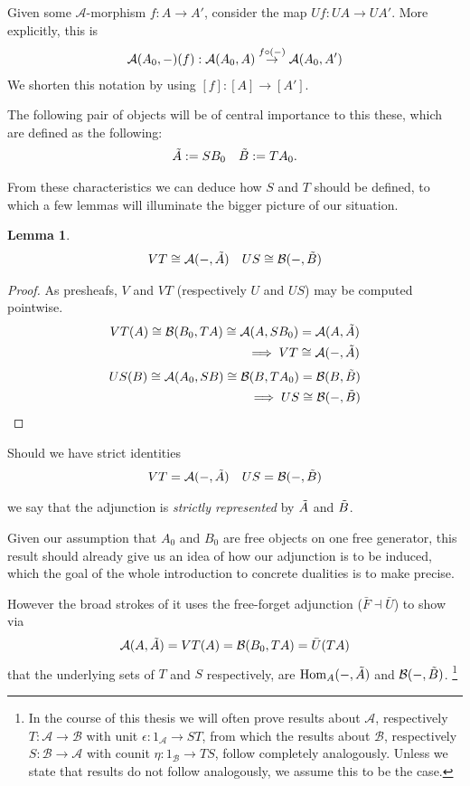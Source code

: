 \documentclass[12pt,a4paper]{article}
\newtheorem{lemma}{Lemma}[section] %
\DeclareMathOperator{\Hom}{Hom}
\def\HomA{\ensuremath\mathcal{A}}
\def\HomB{\ensuremath\mathcal{B}}
\def\t{\ensuremath\tilde}
\begin{document}
Given some $\mathcal{A}$-morphism $f: A\to A'$, consider the map $Uf: UA \to UA'$. More explicitly, this is \begin{align*}
 	\HomA(A_0, -) (f) : \HomA(A_0, A) \stackrel{f \circ (-)}{\to} \HomA(A_0, A')
 \end{align*}
We shorten this notation by using $[f]: [A] \to [A']$.

The following pair of objects will be of central importance to this these, which are defined as the following:
\begin{align*}
	\t A := SB_0&&
	\t B := TA_0.
\end{align*}


From these characteristics we can deduce how $S$ and $T$ should be defined, to which a few lemmas will illuminate the bigger picture of our situation.
\begin{lemma}
\begin{align*}
		VT \cong \HomA(-, \t  A)&&
	US \cong \HomB(-, \t  B)\\
\end{align*}
\end{lemma}
\begin{proof}
As presheafs, $V$ and $VT$ (respectively $U$ and $US$) may be computed pointwise. 
\begin{align*}
	VT(A) \cong \HomB(B_0, TA) \cong \HomA(A,SB_0) = \HomA(A, \t A) \\
	\implies VT \cong \HomA(-, \t A)
\end{align*}
\begin{align*}
	US(B) \cong  \HomA(A_0, SB) \cong  \HomB(B,TA_0) =  \HomB(B, \t B) \\
	\implies US \cong \HomB(-, \t B)
\end{align*}
\end{proof}
Should we have strict identities
\begin{align*}
		VT = \HomA(-, \t  A)&&
	US = \HomB(-, \t  B)\\
\end{align*} 

we say that the adjunction is \emph{strictly represented} by $\t A$ and $\t B$. 

Given our assumption that $A_0$ and $B_0$ are free objects on one free generator, this result should already give us an idea of how our adjunction is to be induced, which the goal of the whole introduction to concrete dualities is to make precise. 

However the broad strokes of it uses the free-forget  adjunction ($\bar F \dashv \bar U$)  to show via \begin{align*}
	\HomA(A, \t A) = VT(A) = \HomB(B_0, T A) = \bar U(TA)
\end{align*} 
that the underlying sets of $T$ and $S$ respectively, are $\Hom_A(-, \t A)$ and $\HomB(-, \t B)$. \footnote{In the course of this thesis we will often prove results about $\mathcal{A}$, respectively $T: \mathcal{A}\to \mathcal{B}$ with unit $\epsilon:1_\mathcal{A} \to ST $, from which the results about $\mathcal{B}$, respectively $S: \mathcal{B} \to \mathcal{A}$ with counit $\eta: 1_\mathcal{B} \to TS$, follow completely analogously. Unless we state that results do not follow analogously, we assume this to be the case.}
\end{document}
